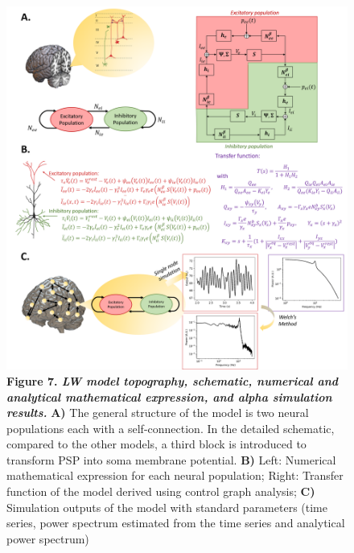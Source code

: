 \documentclass[12pt,twoside]{article}
\begin{document}
\begin{figure}[H]
    \centering
    \includegraphics[scale=0.45]{Images/Liley_schematic_3.png}
    \caption*{\textbf{Figure 7. \textit{LW model  topography, schematic, numerical and analytical mathematical expression, and alpha simulation results.}} \textbf{A)} The general structure of the model is two neural populations each with a self-connection. In the detailed schematic, compared to the other models, a third block is introduced to transform PSP into soma membrane potential. \textbf{B)} Left: Numerical mathematical expression for each neural population; Right: Transfer function of the model derived using control graph analysis; \textbf{C)} Simulation outputs of the model with standard parameters (time series, power spectrum estimated from the time series and analytical power spectrum)
    }        
    \label{fig:Lil_topography}
\end{figure}
\end{document}
